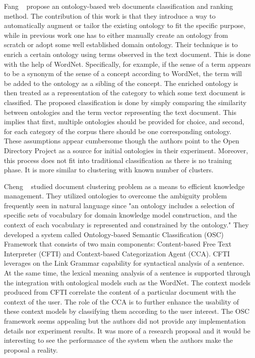 Fang \etal~\cite{Fang2007Ont} propose an ontology-based web documents classification and ranking method. The contribution of this work is that they introduce a way to automatically augment or tailor the existing ontology to fit the specific purpose, while in previous work one has to either manually create an ontology from scratch or adopt some well established domain ontology. Their technique is to enrich a certain ontology using terms observed in the text document. This is done with the help of WordNet. Specifically, for example, if the sense of a term appears to be a synonym of the sense of a concept according to WordNet, the term will be added to the ontology as a sibling of the concept. The enriched ontology is then treated as a representation of the category to which some text document is classified. The proposed classification is done by simply comparing the similarity between ontologies and the term vector representing the text document. This implies that first, multiple ontologies should be provided for choice, and second, for each category of the corpus there should be one corresponding ontology. These assumptions appear cumbersome though the authors point to the Open Directory Project as a source for initial ontologies in their experiment. Moreover, this process does not fit into traditional classification as there is no training phase. It is more similar to clustering with known number of clusters.

Cheng \etal~\cite{ChengPK03} studied document clustering problem as a means to efficient knowledge management. They utilized ontologies to overcome the ambiguity problem frequently seen in natural language since "an ontology includes a selection of specific sets of vocabulary for domain knowledge model construction, and the context of each vocabulary is represented and constrained by the ontology." They developed a system called Ontology-based Semantic Classification (OSC) Framework that consists of two main components: Content-based Free Text Interpreter (CFTI) and Context-based Categorization Agent (CCA). CFTI leverages on the Link Grammar capability for syntactical analysis of a sentence. At the same time, the lexical meaning analysis of a sentence is supported through the integration with ontological models such as the WordNet. The context models produced from CFTI correlate the content of a particular document with the context of the user. The role of the CCA is to further enhance the usability of these context models by classifying them according to the user interest. The OSC framework seems appealing but the authors did not provide any implementation details nor experiment results. It was more of a research proposal and it would be interesting to see the performance of the system when the authors make the proposal a reality.

